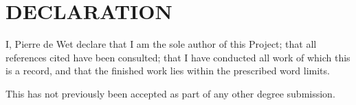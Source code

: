 \chapter*{DECLARATION}

I, Pierre de Wet declare that I am the sole author of this Project; that all references cited have been consulted; that I have conducted all work of which this is a record, and that the finished work lies within the prescribed word limits.

This has not previously been accepted as part of any other degree submission.
\vfill
\noindent {} \hfill
 
